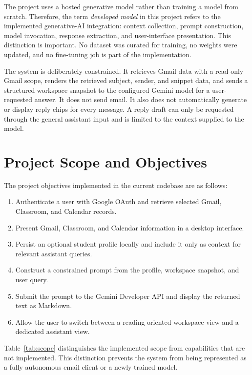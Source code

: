 \documentclass[conference]{IEEEtran}
\begin{document}
The project uses a hosted generative model rather than training a model from scratch. Therefore, the term \emph{developed model} in this project refers to the implemented generative-AI integration: context collection, prompt construction, model invocation, response extraction, and user-interface presentation. This distinction is important. No dataset was curated for training, no weights were updated, and no fine-tuning job is part of the implementation.

The system is deliberately constrained. It retrieves Gmail data with a read-only Gmail scope, renders the retrieved subject, sender, and snippet data, and sends a structured workspace snapshot to the configured Gemini model for a user-requested answer. It does not send email. It also does not automatically generate or display reply chips for every message. A reply draft can only be requested through the general assistant input and is limited to the context supplied to the model.

\section{Project Scope and Objectives}

The project objectives implemented in the current codebase are as follows:

\begin{enumerate}
    \item Authenticate a user with Google OAuth and retrieve selected Gmail, Classroom, and Calendar records.
    \item Present Gmail, Classroom, and Calendar information in a desktop interface.
    \item Persist an optional student profile locally and include it only as context for relevant assistant queries.
    \item Construct a constrained prompt from the profile, workspace snapshot, and user query.
    \item Submit the prompt to the Gemini Developer API and display the returned text as Markdown.
    \item Allow the user to switch between a reading-oriented workspace view and a dedicated assistant view.
\end{enumerate}

Table~\ref{tab:scope} distinguishes the implemented scope from capabilities that are not implemented. This distinction prevents the system from being represented as a fully autonomous email client or a newly trained model.
\end{document}
